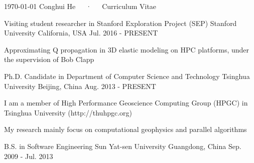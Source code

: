 \documentclass[11pt, a4paper]{awesome-cv}
\begin{document}
\makecvheader

\makecvfooter
  {\today}
  {Conghui He~~~·~~~Curriculum Vitae}
  {\thepage}




\begin{cventries}

  \cventry
    {Visiting student researcher in Stanford Exploration Project (SEP)} %
    {Stanford University} %
    {California, USA} %
    {Jul. 2016 - PRESENT} %
    {
      \begin{cvitems} %
        \item {Approximating Q propagation in 3D elastic modeling on HPC platforms, under the supervision of Bob Clapp}
      \end{cvitems}
    }

  \cventry
    {Ph.D. Candidate in Department of Computer Science and Technology} %
    {Tsinghua University} %
    {Beijing, China} %
    {Aug. 2013 - PRESENT} %
    {
      \begin{cvitems} %
        \item {I am a member of High Performance Geoscience Computing Group (HPGC) in Tsinghua University (http://thuhpgc.org)}
        \item {My research mainly focus on computational geophysics and parallel algorithms}
      \end{cvitems}
    }

  \cventry
    {B.S. in Software Engineering} %
    {Sun Yat-sen University} %
    {Guangdong, China} %
    {Sep. 2009 - Jul. 2013} %
    {}
\end{cventries}
\end{document}

